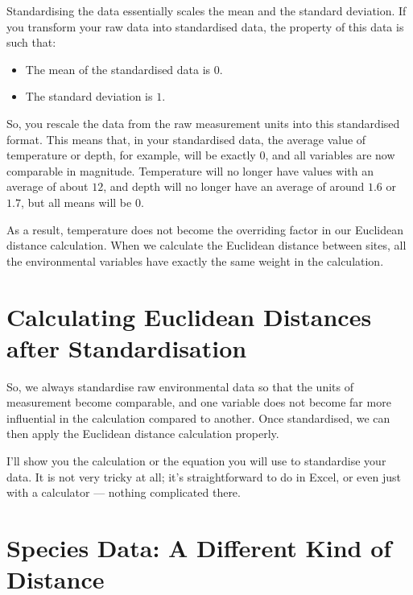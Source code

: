\documentclass[
  12pt,
]{book}
\providecommand{\tightlist}{%
  \setlength{\itemsep}{0pt}\setlength{\parskip}{0pt}}
\begin{document}
Standardising the data essentially scales the mean and the standard
deviation. If you transform your raw data into standardised data, the
property of this data is such that:

\begin{itemize}
\tightlist
\item
  The mean of the standardised data is \(0\).
\item
  The standard deviation is \(1\).
\end{itemize}

So, you rescale the data from the raw measurement units into this
standardised format. This means that, in your standardised data, the
average value of temperature or depth, for example, will be exactly
\(0\), and all variables are now comparable in magnitude. Temperature
will no longer have values with an average of about \(12\), and depth
will no longer have an average of around \(1.6\) or \(1.7\), but all
means will be \(0\).

As a result, temperature does not become the overriding factor in our
Euclidean distance calculation. When we calculate the Euclidean distance
between sites, all the environmental variables have exactly the same
weight in the calculation.

\section{Calculating Euclidean Distances after
Standardisation}\label{calculating-euclidean-distances-after-standardisation}

So, we always standardise raw environmental data so that the units of
measurement become comparable, and one variable does not become far more
influential in the calculation compared to another. Once standardised,
we can then apply the Euclidean distance calculation properly.

I'll show you the calculation or the equation you will use to
standardise your data. It is not very tricky at all; it's
straightforward to do in Excel, or even just with a calculator ---
nothing complicated there.

\section{Species Data: A Different Kind of
Distance}\label{species-data-a-different-kind-of-distance}
\end{document}
